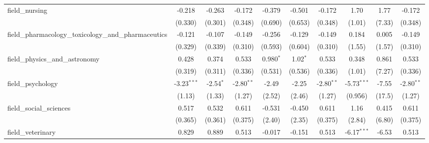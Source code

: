 \begin{tabular}{lccccccccc}
   field\_nursing                                              & -0.218         & -0.263         & -0.172        & -0.379        & -0.501        & -0.172        & 1.70          & 1.77    & -0.172\\   
                                                               & (0.330)        & (0.301)        & (0.348)       & (0.690)       & (0.653)       & (0.348)       & (1.01)        & (7.33)  & (0.348)\\   
   field\_pharmacology\_toxicology\_and\_pharmaceutics         & -0.121         & -0.107         & -0.149        & -0.256        & -0.129        & -0.149        & 0.184         & 0.005   & -0.149\\   
                                                               & (0.329)        & (0.339)        & (0.310)       & (0.593)       & (0.604)       & (0.310)       & (1.55)        & (1.57)  & (0.310)\\   
   field\_physics\_and\_astronomy                              & 0.428          & 0.374          & 0.533         & 0.980$^{*}$   & 1.02$^{*}$    & 0.533         & 0.348         & 0.861   & 0.533\\   
                                                               & (0.319)        & (0.311)        & (0.336)       & (0.531)       & (0.536)       & (0.336)       & (1.01)        & (7.27)  & (0.336)\\   
   field\_psychology                                           & -3.23$^{***}$  & -2.54$^{*}$    & -2.80$^{**}$  & -2.49         & -2.25         & -2.80$^{**}$  & -5.73$^{***}$ & -7.55   & -2.80$^{**}$\\   
                                                               & (1.13)         & (1.33)         & (1.27)        & (2.52)        & (2.46)        & (1.27)        & (0.956)       & (17.5)  & (1.27)\\   
   field\_social\_sciences                                     & 0.517          & 0.532          & 0.611         & -0.531        & -0.450        & 0.611         & 1.16          & 0.415   & 0.611\\   
                                                               & (0.365)        & (0.361)        & (0.375)       & (2.40)        & (2.35)        & (0.375)       & (2.84)        & (6.80)  & (0.375)\\   
   field\_veterinary                                           & 0.829          & 0.889          & 0.513         & -0.017        & -0.151        & 0.513         & -6.17$^{***}$ & -6.53   & 0.513\\   

\end{tabular}
